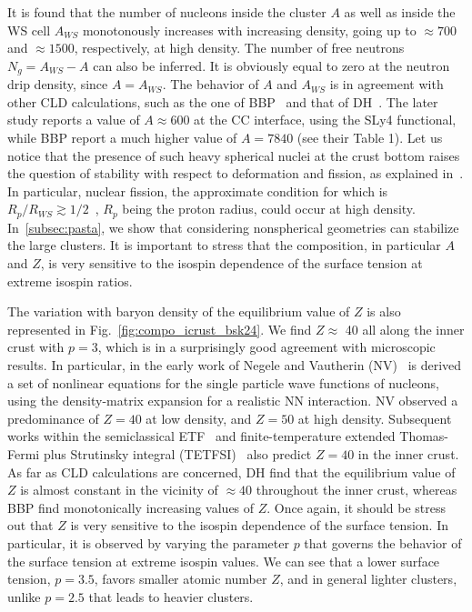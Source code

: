It is found that the number of nucleons inside the cluster $A$ as well as inside 
the WS cell $A_{WS}$ monotonously increases with increasing density, going up 
to $\approx 700$ and $\approx 1500$, respectively, at high density. The number 
of free neutrons $N_g = A_{WS} - A$ can also be inferred. It is obviously equal 
to zero at the neutron drip density, since $A=A_{WS}$.
The behavior of $A$ and $A_{WS}$ is in agreement with other CLD calculations, 
such as the one of BBP~\cite{BBP} and that of DH~\cite{Douchin2000a}. The later 
study reports a value of $A \approx 600$ at the CC interface, using the 
SLy4 functional, while BBP report a much higher value of $A=7840$ (see their 
Table 1). Let us notice that the presence of such heavy spherical nuclei at the
crust bottom raises the question of stability with respect to deformation and
fission, as explained in~\cite{Douchin2000a}. In particular, nuclear fission, 
the approximate condition for which is $R_p/R_{WS} \gtrsim
1/2$~\cite{Bohr1939,Pethick1995}, $R_p$ being the
proton radius, could occur at high density. In~\ref{subsec:pasta}, we show that 
considering nonspherical geometries can stabilize the large clusters. It is 
important to stress that the composition, in particular $A$ and $Z$, is very 
sensitive to the isospin dependence of the surface tension at extreme isospin 
ratios. 

The variation with baryon density of the equilibrium value of $Z$ is also 
represented in Fig.~\ref{fig:compo_icrust_bsk24}. We find $Z \approx$ 40 all
along the inner crust with $p=3$, which is in a surprisingly good agreement with 
microscopic results. In particular, in the early work of Negele and Vautherin
(NV)~\cite{Negele1973} is derived a set of nonlinear equations for the single
particle wave functions of nucleons, using the density-matrix expansion for a
realistic NN interaction. NV observed a predominance of $Z=40$ at low density, 
and $Z=50$ at high density. Subsequent works within the semiclassical
ETF~\cite{Goriely2005} and finite-temperature extended Thomas-Fermi plus
Strutinsky integral (TETFSI)~\cite{Onsi2008,Pearson2018} also predict $Z=40$ in
the inner crust. As far as CLD calculations are concerned, DH find that the 
equilibrium value of $Z$ is almost constant in the vicinity of $\approx 40$ 
throughout the inner crust, whereas BBP find monotonically increasing values of $Z$. 
Once again, it should be stress out that $Z$ is very sensitive to the isospin
dependence of the surface tension. In particular, it is observed by varying 
the parameter $p$ that governs the behavior of the surface tension at extreme 
isospin values. We can see that a lower surface tension, $p=3.5$, favors smaller 
atomic number $Z$, and in general lighter clusters, unlike $p=2.5$ that leads to 
heavier clusters.

